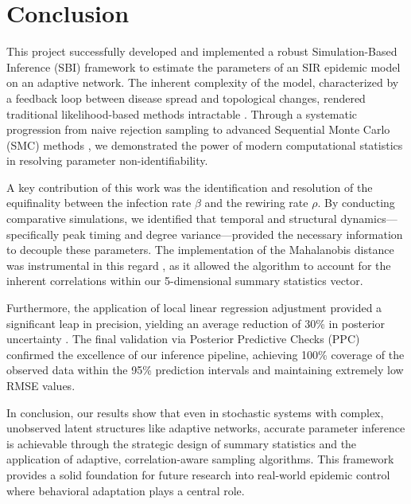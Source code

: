 \section{Conclusion}

This project successfully developed and implemented a robust Simulation-Based Inference (SBI) framework to estimate the parameters of an SIR epidemic model on an adaptive network.
The inherent complexity of the model, characterized by a feedback loop between disease spread and topological changes, rendered traditional likelihood-based methods intractable \parencite{demirel2017dynamics}.
Through a systematic progression from naive rejection sampling to advanced Sequential Monte Carlo (SMC) methods \parencite{beaumont2009adaptive}, we demonstrated the power of modern computational statistics in resolving parameter non-identifiability.

A key contribution of this work was the identification and resolution of the equifinality between the infection rate $\beta$ and the rewiring rate $\rho$.
By conducting comparative simulations, we identified that temporal and structural dynamics—specifically peak timing and degree variance—provided the necessary information to decouple these parameters.
The implementation of the Mahalanobis distance was instrumental in this regard \parencite{nott2014approximate}, as it allowed the algorithm to account for the inherent correlations within our 5-dimensional summary statistics vector.

Furthermore, the application of local linear regression adjustment \parencite{beaumont2002approximate} provided a significant leap in precision, yielding an average reduction of 30\% in posterior uncertainty \parencite{blum2017regression}.
The final validation via Posterior Predictive Checks (PPC) confirmed the excellence of our inference pipeline, achieving 100\% coverage of the observed data within the 95\% prediction intervals and maintaining extremely low RMSE values.

In conclusion, our results show that even in stochastic systems with complex, unobserved latent structures like adaptive networks, accurate parameter inference is achievable through the strategic design of summary statistics and the application of adaptive, correlation-aware sampling algorithms.
This framework provides a solid foundation for future research into real-world epidemic control where behavioral adaptation plays a central role.